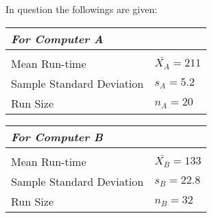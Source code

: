 \noindent In question the followings are given:
\begin{multicols}{2}
  \begin{table}[H]
    \centering
    \begin{tabular}{l|l}
    \multicolumn{2}{l}{\textit{\textbf{For Computer A}}}  \\ \hline
                                                   \\
    Mean Run-time             & $\bar{X_A} = 211$  \\
    Sample Standard Deviation & $s_A = 5.2$        \\
    Run Size                  & $n_A = 20$     
    \end{tabular}
  \end{table}


  \begin{table}[H]
    \centering
    \begin{tabular}{l|l}
    \multicolumn{2}{l}{\textit{\textbf{For Computer B}}}  \\ \hline
                                                   \\
    Mean Run-time             & $\bar{X_B} = 133$  \\
    Sample Standard Deviation & $s_B = 22.8$       \\
    Run Size                  & $n_B = 32$     
    \end{tabular}
  \end{table}
\end{multicols}
